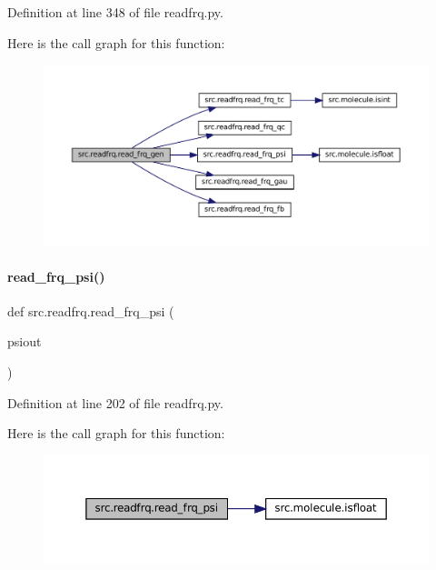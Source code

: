 Definition at line 348 of file readfrq.\+py.

Here is the call graph for this function\+:
\nopagebreak
\begin{figure}[H]
\begin{center}
\leavevmode
\includegraphics[width=350pt]{namespacesrc_1_1readfrq_aa60d506cc40377d6ca6736729b25a8bd_cgraph}
\end{center}
\end{figure}
\mbox{\label{namespacesrc_1_1readfrq_ab76215acf9b8b25d9fcdfa39e6af2633}} 
\paragraph{\texorpdfstring{read\+\_\+frq\+\_\+psi()}{read\_frq\_psi()}}
{\footnotesize\ttfamily def src.\+readfrq.\+read\+\_\+frq\+\_\+psi (\begin{DoxyParamCaption}\item[{}]{psiout }\end{DoxyParamCaption})}



Definition at line 202 of file readfrq.\+py.

Here is the call graph for this function\+:
\nopagebreak
\begin{figure}[H]
\begin{center}
\leavevmode
\includegraphics[width=350pt]{namespacesrc_1_1readfrq_ab76215acf9b8b25d9fcdfa39e6af2633_cgraph}
\end{center}
\end{figure}
\mbox{\label{namespacesrc_1_1readfrq_a3658ba083ec7f18a0bfbada9e6272301}} 

